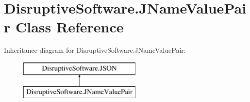 \hypertarget{class_disruptive_software_1_1_j_name_value_pair}{\section{Disruptive\+Software.\+J\+Name\+Value\+Pair Class Reference}
\label{class_disruptive_software_1_1_j_name_value_pair}
}
Inheritance diagram for Disruptive\+Software.\+J\+Name\+Value\+Pair\+:\begin{figure}[H]
\begin{center}
\leavevmode
\includegraphics[height=2.000000cm]{class_disruptive_software_1_1_j_name_value_pair}
\end{center}
\end{figure}
